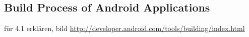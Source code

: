 \subsection{Build Process of Android Applications}\label{subsection:foundation-android-build}
für 4.1 erklären, bild
\url{http://developer.android.com/tools/building/index.html}\newline
